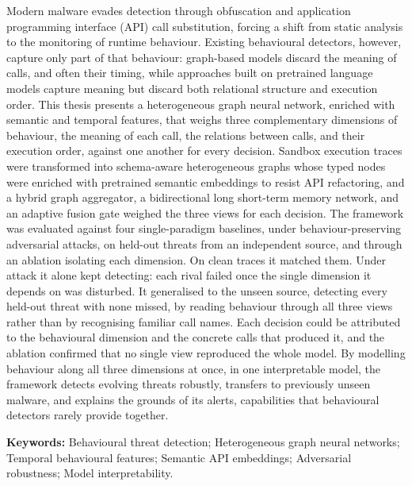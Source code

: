 \documentclass[%
    BCOR=10mm,
    DIV=13,
    toc=bibliography,
    toc=listof,
    oneside,
    12pt,
]{scrbook}
\let\cleardoublepage\clearpage
\begin{document}
\noindent
Modern malware evades detection through obfuscation and application programming
interface (API) call substitution, forcing a shift from static analysis to the
monitoring of runtime behaviour. Existing behavioural detectors, however,
capture only part of that behaviour: graph-based models discard the meaning of
calls, and often their timing, while approaches built on pretrained language
models capture meaning but discard both relational structure and execution
order. This thesis presents a heterogeneous graph neural network, enriched with
semantic and temporal features, that weighs three complementary dimensions of
behaviour, the meaning of each call, the relations between calls, and their
execution order, against one another for every decision. Sandbox execution
traces were transformed into schema-aware heterogeneous graphs whose typed
nodes were enriched with pretrained semantic embeddings to resist API
refactoring, and a hybrid graph aggregator, a bidirectional long short-term
memory network, and an adaptive fusion gate weighed the three views for each
decision. The framework was evaluated against four single-paradigm baselines,
under behaviour-preserving adversarial attacks, on held-out threats from an
independent source, and through an ablation isolating each dimension. On clean
traces it matched them. Under attack it alone kept detecting: each rival failed
once the single dimension it depends on was disturbed. It generalised to the
unseen source, detecting every held-out threat with none missed, by reading
behaviour through all three views rather than by recognising familiar call
names. Each decision could be attributed to the behavioural dimension and the
concrete calls that produced it, and the ablation confirmed that no single view
reproduced the whole model. By modelling behaviour along all three dimensions
at once, in one interpretable model, the framework detects evolving threats
robustly, transfers to previously unseen malware, and explains the grounds of
its alerts, capabilities that behavioural detectors rarely provide together.

\vspace{1em}
\noindent\textbf{Keywords:} Behavioural threat detection; Heterogeneous graph neural
networks; Temporal behavioural features; Semantic API embeddings; Adversarial robustness;
Model interpretability.

\begingroup
{}
\tableofcontents
\endgroup
\begingroup
{}
\listoffigures
\medskip
\begingroup\let\clearpage\relax\let\cleardoublepage\relax
\listoftables
\endgroup
\endgroup
\newpage
\end{document}
